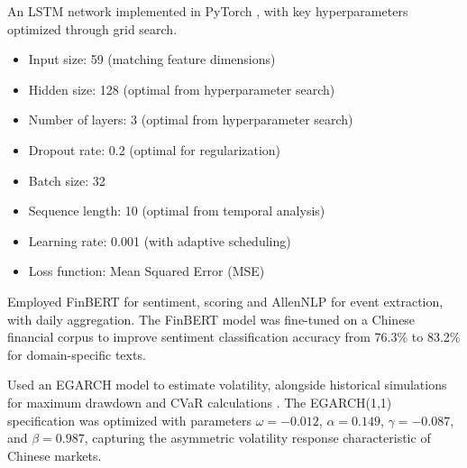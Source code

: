 \documentclass[3p,times,procedia]{elsarticle}
\begin{document}
 An LSTM network implemented in PyTorch \cite{Paszke2019,hochreiter1997lstm},
with key hyperparameters optimized through grid search.
\begin{itemize}
    \item Input size: 59 (matching feature dimensions)
\item Hidden size: 128 (optimal from hyperparameter search)
\item Number of layers: 3 (optimal from hyperparameter search)
\item Dropout rate: 0.2 (optimal for regularization)
\item Batch size: 32
\item Sequence length: 10 (optimal from temporal analysis)
\item Learning rate: 0.001 (with adaptive scheduling)
\item Loss function: Mean Squared Error (MSE)
\end{itemize}

 Employed FinBERT \cite{Araci2019} for \allowbreak sentiment, scoring and AllenNLP \cite{Gardner2018} for event extraction, with daily aggregation. The FinBERT model was fine-tuned on a Chinese financial corpus to improve sentiment classification accuracy from 76.3\% to 83.2\% for domain-specific texts.

 Used an EGARCH model \cite{Nelson1991} to estimate volatility, alongside historical simulations for maximum drawdown and CVaR calculations \cite{Rockafellar2000}. The EGARCH(1,1) specification was optimized with parameters $\omega = -0.012$, $\alpha = 0.149$, $\gamma = -0.087$, and $\beta = 0.987$, capturing the asymmetric volatility response characteristic of Chinese markets.
\end{document}
